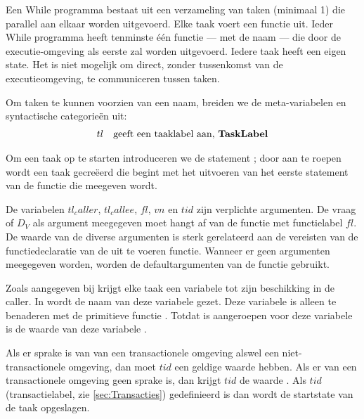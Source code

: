 
Een While programma bestaat uit een verzameling van taken (minimaal 1) die parallel aan elkaar worden uitgevoerd. Elke
taak voert een functie uit. Ieder While programma heeft tenminste \'e\'en functie --- met de naam  ---
die door de executie-omgeving als eerste zal worden uitgevoerd. Iedere taak heeft een eigen state. Het is niet mogelijk
om direct, zonder tussenkomst van de executieomgeving, te communiceren tussen taken.

Om taken te kunnen voorzien van een naam, breiden we de meta-variabelen en syntactische categorie\"en uit:
\begin{equation*}
\begin{array}{rl}
	tl & \textrm{geeft een \Index{taaklabel} aan, \syncat{TaskLabel}}
\end{array}
\end{equation*}

Om een taak op te starten introduceren we de statement ; door  aan te roepen wordt een taak
gecre\"eerd die begint met het uitvoeren van het eerste statement van de functie die meegeven wordt.

De variabelen \(tl_caller\), \(tl_callee\), \(fl\), \(vn\) en \(tid\) zijn verplichte argumenten. De vraag of \(D_V\) als
argument meegegeven moet hangt af van de functie met functielabel \(fl\). De waarde van de diverse argumenten is sterk
gerelateerd aan de vereisten van de functiedeclaratie van de uit te voeren functie. Wanneer er geen argumenten meegegeven
worden, worden de defaultargumenten van de functie gebruikt.

Zoals aangegeven bij  krijgt elke taak een variabele tot zijn beschikking in de caller. In
 wordt de naam van deze variabele gezet. Deze variabele is alleen te benaderen met de primitieve functie
. Totdat  is aangeroepen voor deze variabele is de waarde van deze variabele .

Als er sprake is van van een transactionele omgeving alswel een niet-transactionele omgeving, dan moet \(tid\) een
geldige waarde hebben. Als er van een transactionele omgeving geen sprake is, dan krijgt \(tid\) de waarde .
Als \(tid\) (transactielabel, zie \ref{sec:Transacties}) gedefinieerd is dan wordt de startstate van de taak opgeslagen.

